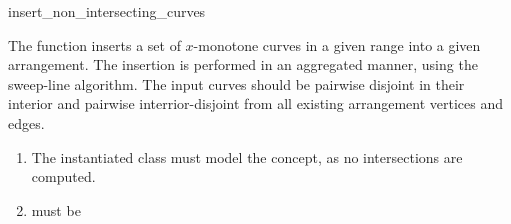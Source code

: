 \ccRefPageBegin

\begin{ccRefFunction}{insert_non_intersecting_curves}

\ccDefinition

The function \ccRefName{} inserts a set of $x$-monotone curves in a given
range into a given arrangement. The insertion is performed in an aggregated
manner, using the sweep-line algorithm. The input curves should be pairwise
disjoint in their interior and pairwise interrior-disjoint from all existing
arrangement vertices and edges. 



\ccRequirements
\begin{enumerate}
\item The instantiated  class must model the
   concept, as no intersections are computed.
\item {} must be 
\end{enumerate}

\end{ccRefFunction}

\ccRefPageEnd

